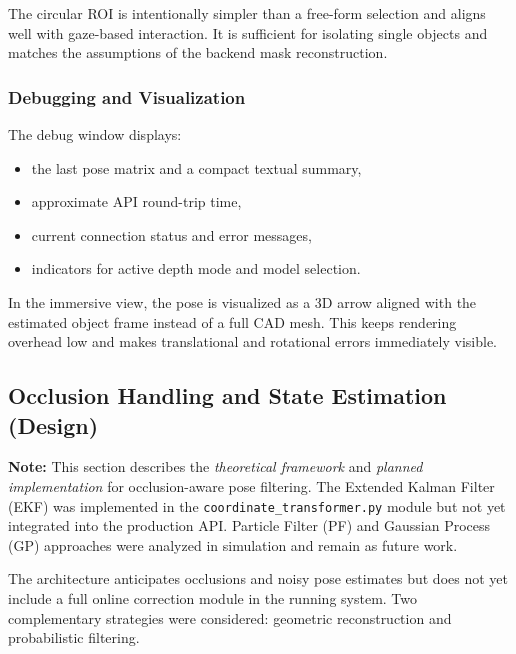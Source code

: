 The circular ROI is intentionally simpler than a free-form selection and aligns well with gaze-based interaction. It is sufficient for isolating single objects and matches the assumptions of the backend mask reconstruction.

\subsubsection{Debugging and Visualization}

The debug window displays:

\begin{itemize}
    \item the last pose matrix and a compact textual summary,
    \item approximate API round-trip time,
    \item current connection status and error messages,
    \item indicators for active depth mode and model selection.
\end{itemize}

In the immersive view, the pose is visualized as a 3D arrow aligned with the estimated object frame instead of a full CAD mesh. This keeps rendering overhead low and makes translational and rotational errors immediately visible.

\subsection{Occlusion Handling and State Estimation (Design)}
\label{subsec:occlusion-design}

\textbf{Note:} This section describes the \emph{theoretical framework} and \emph{planned implementation} for occlusion-aware pose filtering. The Extended Kalman Filter (EKF) was implemented in the \texttt{coordinate\_transformer.py} module but not yet integrated into the production API. Particle Filter (PF) and Gaussian Process (GP) approaches were analyzed in simulation and remain as future work.

The architecture anticipates occlusions and noisy pose estimates but does not yet include a full online correction module in the running system. Two complementary strategies were considered: geometric reconstruction and probabilistic filtering.

